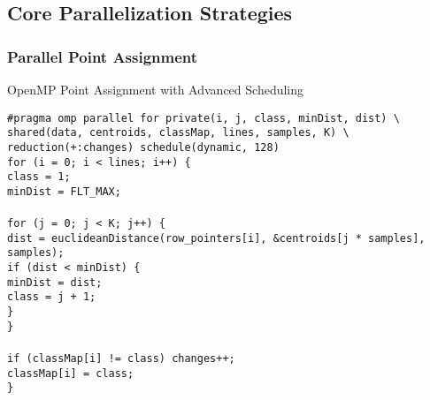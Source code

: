 \documentclass[12pt,a4paper]{article}
\begin{document}
\subsection{Core Parallelization Strategies}

\subsubsection{Parallel Point Assignment}

\begin{algorithm}[H]
\caption{OpenMP Point Assignment with Advanced Scheduling}
\label{alg:omp_assignment}
\begin{flushleft}
\texttt{\#pragma omp parallel for private(i, j, class, minDist, dist) \textbackslash}\\
\hspace{1cm}\texttt{shared(data, centroids, classMap, lines, samples, K) \textbackslash}\\
\hspace{1cm}\texttt{reduction(+:changes) schedule(dynamic, 128)}\\
\texttt{for (i = 0; i < lines; i++) \{}\\
\hspace{1cm}\texttt{class = 1;}\\
\hspace{1cm}\texttt{minDist = FLT\_MAX;}\\
\\
\hspace{1cm}\texttt{for (j = 0; j < K; j++) \{}\\
\hspace{2cm}\texttt{dist = euclideanDistance(row\_pointers[i], \&centroids[j * samples], samples);}\\
\hspace{2cm}\texttt{if (dist < minDist) \{}\\
\hspace{3cm}\texttt{minDist = dist;}\\
\hspace{3cm}\texttt{class = j + 1;}\\
\hspace{2cm}\texttt{\}}\\
\hspace{1cm}\texttt{\}}\\
\\
\hspace{1cm}\texttt{if (classMap[i] != class) changes++;}\\
\hspace{1cm}\texttt{classMap[i] = class;}\\
\texttt{\}}
\end{flushleft}
\end{algorithm}
\end{document}
